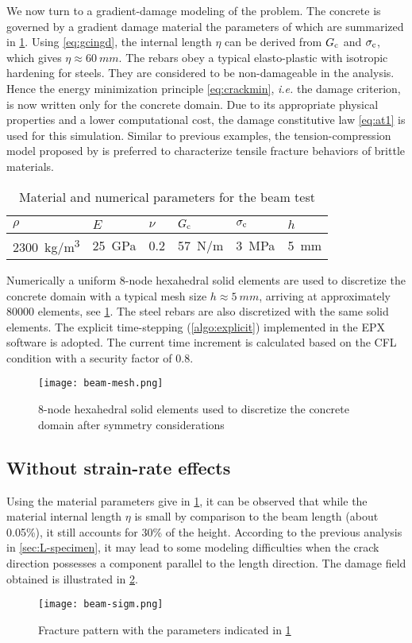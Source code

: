 We now turn to a gradient-damage modeling of the problem. The concrete is governed by a gradient damage material the parameters of which are summarized in \cref{tab:beamconcrete}. Using \eqref{eq:gcingd}, the internal length $\eta$ can be derived from $G_\mathrm{c}$ and $\sigma_{\mathrm{c}}$, which gives $\eta\approx \SI{60}{mm}$. The rebars obey a typical elasto-plastic with isotropic hardening for steels. They are considered to be non-damageable in the analysis. Hence the energy minimization principle \eqref{eq:crackmin}, \emph{i.e.} the damage criterion, is now written only for the concrete domain. Due to its appropriate physical properties and a lower computational cost, the damage constitutive law \eqref{eq:at1} is used for this simulation. Similar to previous examples, the tension-compression model proposed by \cite{FreddiRoyer-Carfagni:2010} is preferred to characterize tensile fracture behaviors of brittle materials.
\begin{table}[htbp]
\centering
\caption{Material and numerical parameters for the beam test} \label{tab:beamconcrete}
\begin{tabular}{llllll} \toprule
$\rho$ & $E$ & $\nu$ & $G_\mathrm{c}$ & $\sigma_{\mathrm{c}}$ & $h$ \\ \midrule
\SI{2300}{kg/m^3} & \SI{25}{GPa} & 0.2 & \SI{57}{N/m} & \SI{3}{MPa} & \SI{5}{mm} \\ \bottomrule
\end{tabular}
\end{table}

Numerically a uniform 8-node hexahedral solid elements are used to discretize the concrete domain with a typical mesh size $h\approx\SI{5}{mm}$, arriving at approximately \num{80000} elements, see \cref{fig:beammesh}. The steel rebars are also discretized with the same solid elements. The explicit time-stepping (\cref{algo:explicit}) implemented in the EPX software is adopted. The current time increment is calculated based on the CFL condition with a security factor of 0.8.
\begin{figure}[htbp]
\centering
\texttt{[image: beam-mesh.png]}
\caption{8-node hexahedral solid elements used to discretize the concrete domain after symmetry considerations} \label{fig:beammesh}
\end{figure}

\subsection{Without strain-rate effects}
Using the material parameters give in \cref{tab:beamconcrete}, it can be observed that while the material internal length $\eta$ is small by comparison to the beam length (about 0.05\%), it still accounts for 30\% of the height. According to the previous analysis in \cref{sec:L-specimen}, it may lead to some modeling difficulties when the crack direction possesses a component parallel to the length direction. The damage field obtained is illustrated in \cref{fig:beamsigm}.
\begin{figure}[htbp]
\centering
\texttt{[image: beam-sigm.png]}
\caption{Fracture pattern with the parameters indicated in \cref{tab:beamconcrete}} \label{fig:beamsigm}
\end{figure}

